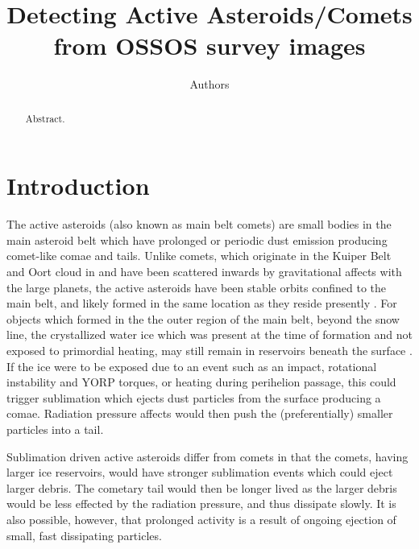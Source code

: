 \documentclass[iop,apj]{emulateapj}
\begin{document}
\title{Detecting Active Asteroids/Comets from OSSOS survey images}
\author{Authors}

\begin{abstract}
Abstract.
\end{abstract}

\maketitle


\section{Introduction}
The active asteroids (also known as main belt comets) are small bodies in the main asteroid belt which have prolonged or periodic dust emission producing comet-like comae and tails. Unlike comets, which originate in the Kuiper Belt and Oort cloud in and have been scattered inwards by gravitational affects with the large planets, the active asteroids have been stable orbits confined to the main belt, and likely formed in the same location as they reside presently \cite{pop of comets 2006}. For objects which formed in the the outer region of the main belt, beyond the snow line, the crystallized water ice which was present at the time of formation and not exposed to primordial heating, may still remain in reservoirs beneath the surface \citep{limits on size, prialnik 2009}. If the ice were to be exposed due to an event such as an impact, rotational instability and YORP torques, or heating during perihelion passage, this could trigger sublimation which ejects dust particles from the surface producing a comae. Radiation pressure affects would then push the (preferentially) smaller particles into a tail.

Sublimation driven active asteroids differ from comets in that the comets, having larger ice reservoirs, would have stronger sublimation events which could eject larger debris. The cometary tail would then be longer lived as the larger debris would be less effected by the radiation pressure, and thus dissipate slowly. It is also possible, however, that prolonged activity is a result of ongoing ejection of small, fast dissipating particles. \cite{cite this}
\end{document}
